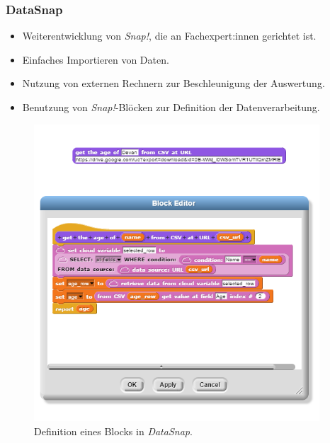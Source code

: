 \begin{frame}
  \frametitle{DataSnap}

  \begin{minipage}{.6\textwidth}
    \begin{itemize}
      \item Weiterentwicklung von \textit{Snap!}, die an Fachexpert:innen gerichtet ist.
      \item Einfaches Importieren von Daten.
      \item Nutzung von externen Rechnern zur Beschleunigung der Auswertung.
      \item Benutzung von \textit{Snap!}-Blöcken zur Definition der Datenverarbeitung.
    \end{itemize}
  \end{minipage}%
  \begin{minipage}{.4\textwidth}
    \begin{figure}
      \begin{center}
        \includegraphics[width=0.95\textwidth]{assets/datasnap-block-definition.png}
      \end{center}
      \caption{Definition eines Blocks in \textit{DataSnap}. \parencite[26]{hellmannDataSnapEnabling2015}}
    \end{figure}
  \end{minipage}


\end{frame}


